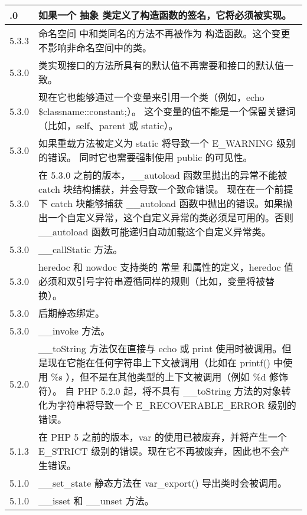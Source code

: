 \begin{longtable}{|m{30pt}|m{350pt}|}
\endlastfoot
\hline
5.4.0	 &如果一个 抽象 类定义了构造函数的签名，它将必须被实现。\\
\hline
5.3.3	 & 命名空间 中和类同名的方法不再被作为 构造函数。这个变更不影响非命名空间中的类。\\
\hline
5.3.0	 &类实现接口的方法所具有的默认值不再需要和接口的默认值一致。\\
\hline
5.3.0	 &现在它也能够通过一个变量来引用一个类（例如，echo \$classname::constant;）。 这个变量的值不能是一个保留关键词（比如，self、parent 或 static）。\\
\hline
5.3.0	 &如果重载方法被定义为 static 将导致一个 E\_WARNING 级别的错误。 同时它也需要强制使用 public 的可见性。\\
\hline
5.3.0	 &在 5.3.0 之前的版本，\_\_autoload 函数里抛出的异常不能被 catch 块结构捕获，并会导致一个致命错误。 现在在一个前提下 catch 块能够捕获 \_\_autoload 函数中抛出的错误。如果抛出一个自定义异常，这个自定义异常的类必须是可用的。否则 \_\_autoload 函数可能递归自动加载这个自定义异常类。\\
\hline
5.3.0	 & \_\_callStatic 方法。\\
\hline
5.3.0	 & heredoc 和 nowdoc 支持类的 常量 和属性的定义，heredoc 值必须和双引号字符串遵循同样的规则（比如，变量将被替换）。\\
\hline
5.3.0	 &后期静态绑定。\\
\hline
5.3.0	 & \_\_invoke 方法。\\
\hline
5.2.0	 &\_\_toString 方法仅在直接与 echo 或 print 使用时被调用。但是现在它能在任何字符串上下文被调用（比如在 printf() 中使用 \%s ），但不是在其他类型的上下文被调用（例如 \%d 修饰符）。 自 PHP 5.2.0 起，将不具有 \_\_toString 方法的对象转化为字符串将导致一个 E\_RECOVERABLE\_ERROR 级别的错误。\\
\hline
5.1.3	 &在 PHP 5 之前的版本，var 的使用已被废弃，并将产生一个 E\_STRICT 级别的错误。现在它不再被废弃，因此也不会产生错误。\\
\hline
5.1.0	 &\_\_set\_state 静态方法在 var\_export() 导出类时会被调用。\\
\hline
5.1.0	 &\_\_isset 和 \_\_unset 方法。\\
\hline
\end{longtable}











\clearpage